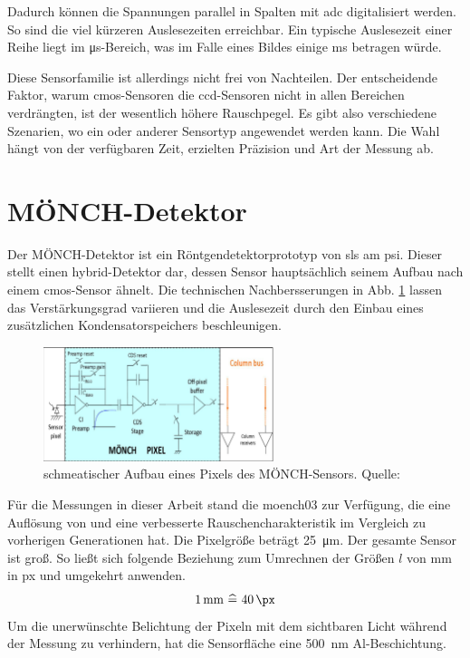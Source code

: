 \noindent
Dadurch können die Spannungen parallel in Spalten mit \gls{adc} digitalisiert werden. So sind die viel kürzeren Auslesezeiten erreichbar. Ein typische Auslesezeit einer Reihe liegt im \si{\micro\second}-Bereich, was im Falle eines  Bildes einige \si{\milli\second} betragen würde.

\noindent
Diese Sensorfamilie ist allerdings nicht frei von Nachteilen. Der entscheidende Faktor, warum \gls{cmos}-Sensoren die \gls{ccd}-Sensoren nicht in allen Bereichen verdrängten, ist der wesentlich höhere Rauschpegel. Es gibt also verschiedene Szenarien, wo ein oder anderer Sensortyp angewendet werden kann. Die Wahl hängt von der verfügbaren Zeit, erzielten Präzision und Art der Messung ab.

\section{MÖNCH-Detektor}
\label{text:moench_theorie}
Der MÖNCH-Detektor ist ein Röntgendetektorprototyp von \gls{sls} am \gls{psi}. Dieser stellt einen hybrid-Detektor dar, dessen Sensor hauptsächlich seinem Aufbau nach einem \gls{cmos}-Sensor ähnelt. Die technischen Nachbersserungen in Abb. \ref{fig:moench_pixel} lassen das Verstärkungsgrad variieren und die Auslesezeit durch den Einbau eines zusätzlichen Kondensatorspeichers beschleunigen.
\begin{figure}[H]
    \centering
    \includegraphics[width=0.6\textwidth]{images/moench/paper_crop.png}
    \caption{schmeatischer Aufbau eines Pixels des MÖNCH-Sensors. Quelle: \cite{dinapoli_monch_2014}}
    \label{fig:moench_pixel}
\end{figure}
\noindent
Für die Messungen in dieser Arbeit stand die \gls{moench03} zur Verfügung, die eine Auflösung von  und eine verbesserte Rauschencharakteristik im Vergleich zu vorherigen Generationen hat. Die Pixelgröße beträgt \SI{25}{\micro\meter}. Der gesamte Sensor ist  groß. So ließt sich folgende Beziehung zum Umrechnen der Größen $l$ von \si{\milli\meter} in px und umgekehrt anwenden.
\begin{equation}
    \SI{1}{\milli\meter}\ \widehat{=}\ \SI{40}{\px}
    \label{eq:px_mm_ratio}
\end{equation}
\noindent
Um die unerwünschte Belichtung der Pixeln mit dem sichtbaren Licht während der Messung zu verhindern, hat die Sensorfläche eine \SI{500}{\nano\meter} Al-Beschichtung.

